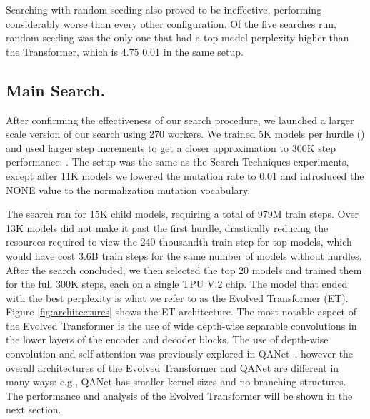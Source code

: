 \documentclass{article}
\begin{document}
Searching with random seeding also proved to be ineffective, performing considerably worse than every other configuration. Of the five searches run, random seeding was the only one that had a top model perplexity higher than the Transformer, which is 4.75  0.01 in the same setup.  

\vspace{-5pt}
\subsection{Main Search.} After confirming the effectiveness of our search procedure, we launched a larger scale version of our search using 270 workers. We trained 5K models per hurdle () and used larger step increments to get a closer approximation to 300K step performance: . The setup was the same as the Search Techniques experiments, except after 11K models we lowered the mutation rate to 0.01 and introduced the \textsc{NONE} value to the normalization mutation vocabulary.

\iffalse
\begin{figure}[h!]
\centering
\centerline{\texttt{[image: transformers\_decoder\_comparison]}}
\caption{\textbf{Transformer and Evolved Transformer decoder blocks.} The ET decoder independently developed a branched wide convolution structure, similar to its encoder. Also similar to the encoder, the latter portion of the ET decoder is almost identical to the Transformer.
}
\label{fig:decoder}
\end{figure}
\fi

The search ran for 15K child models, requiring a total of 979M train steps. Over 13K models did not make it past the first hurdle, drastically reducing the resources required to view the 240 thousandth train step for top models, which would have cost 3.6B train steps for the same number of models without hurdles. After the search concluded, we then selected the top 20 models and trained them for the full 300K steps, each on a single TPU V.2 chip. The model that ended with the best perplexity is what we refer to as the Evolved Transformer (ET). Figure \ref{fig:architectures} shows the ET architecture. The most notable aspect of the Evolved Transformer is the use of wide depth-wise separable convolutions in the lower layers of the encoder and decoder blocks. The use of depth-wise convolution and self-attention was previously explored in QANet~\cite{wei2018fast}, however the overall architectures of the Evolved Transformer and QANet are different in many ways: e.g., QANet has smaller kernel sizes and no branching structures. The performance and analysis of the Evolved Transformer will be shown in the next section.
\end{document}
